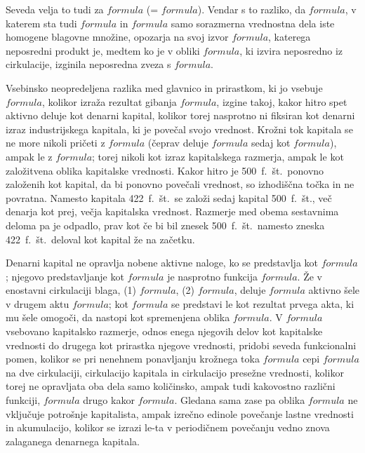 \documentclass[a5paper]{scrbook}
\begin{document}
Seveda velja to tudi za \( formula \) (= \( formula \)). Vendar s to razliko, da \( formula \), v katerem sta tudi \( formula \) in \( formula \) samo sorazmerna vrednostna dela iste homogene blagovne množine, opozarja na svoj izvor \( formula \), katerega neposredni produkt je, medtem ko je v obliki \( formula \), ki izvira neposredno iz cirkulacije, izginila neposredna zveza s \( formula \).

Vsebinsko neopredeljena razlika med glavnico in prirastkom, ki jo vsebuje \( formula \), kolikor izraža rezultat gibanja \( formula \), izgine takoj, kakor hitro spet aktivno deluje kot denarni kapital, kolikor torej nasprotno ni fiksiran kot denarni izraz industrijskega kapitala, ki je povečal svojo vrednost. Krožni tok kapitala se ne more nikoli pričeti z \( formula \) (čeprav deluje \( formula \) sedaj kot \( formula \)), ampak le z \( formula \); torej nikoli kot izraz kapitalskega razmerja, ampak le kot založitvena oblika kapitalske vrednosti. Kakor hitro je 500~f.~št.\ ponovno založenih kot kapital, da bi ponovno povečali vrednost, so izhodiščna točka in ne povratna. Namesto kapitala 422~f.~št.\ se založi sedaj kapital 500~f.~št., več denarja kot prej, večja kapitalska vrednost. Razmerje med obema sestavnima deloma pa je odpadlo, prav kot če bi bil znesek 500~f.~št.\ namesto zneska 422~f.~št.\ deloval kot kapital že na začetku.

Denarni kapital ne opravlja nobene aktivne naloge, ko se predstavlja kot \( formula \); njegovo predstavljanje kot \( formula \) je nasprotno funkcija \( formula \). Že v enostavni cirkulaciji blaga, (1) \( formula \), (2) \( formula \), deluje \( formula \) aktivno šele v drugem aktu \( formula \); kot \( formula \) se predstavi le kot rezultat prvega akta, ki mu šele omogoči, da nastopi kot spremenjena oblika \( formula \). V \( formula \) vsebovano kapitalsko razmerje, odnos enega njegovih delov kot kapitalske vrednosti do drugega kot prirastka njegove vrednosti, pridobi seveda funkcionalni pomen, kolikor se pri nenehnem ponavljanju krožnega toka \( formula \) cepi \( formula \) na dve cirkulaciji, cirkulacijo kapitala in cirkulacijo presežne vrednosti, kolikor torej ne opravljata oba dela samo količinsko, ampak tudi kakovostno različni funkciji, \( formula \) drugo kakor \( formula \). Gledana sama zase pa oblika \( formula \) ne vključuje potrošnje kapitalista, ampak izrečno edinole povečanje lastne vrednosti in akumulacijo, kolikor se izrazi le-ta v periodičnem povečanju vedno znova zalaganega denarnega kapitala.
\end{document}
